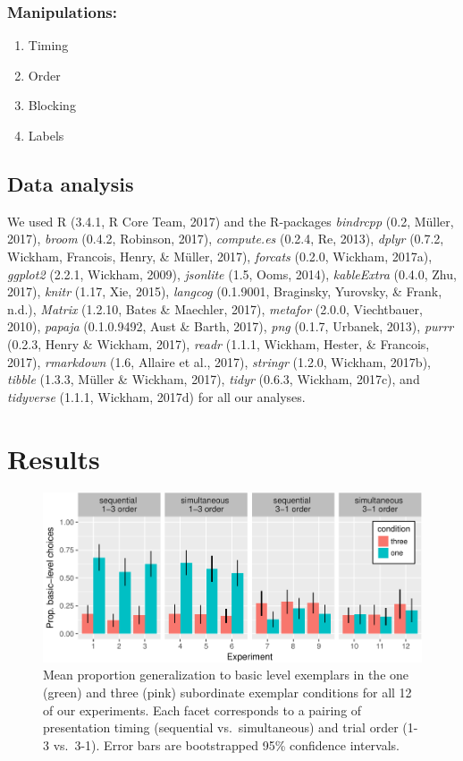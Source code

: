 \documentclass[english,floatsintext,man]{apa6}
\providecommand{\tightlist}{%
  \setlength{\itemsep}{0pt}\setlength{\parskip}{0pt}}
\theoremstyle{definition}
\theoremstyle{definition}
\theoremstyle{remark}
\begin{document}
\subsubsection{Manipulations:}\label{manipulations}

\begin{enumerate}
\def\labelenumi{(\arabic{enumi})}
\tightlist
\item
  Timing
\item
  Order
\item
  Blocking
\item
  Labels
\end{enumerate}

\subsection{Data analysis}\label{data-analysis}

We used R (3.4.1, R Core Team, 2017) and the R-packages \emph{bindrcpp}
(0.2, Müller, 2017), \emph{broom} (0.4.2, Robinson, 2017),
\emph{compute.es} (0.2.4, Re, 2013), \emph{dplyr} (0.7.2, Wickham,
Francois, Henry, \& Müller, 2017), \emph{forcats} (0.2.0, Wickham,
2017a), \emph{ggplot2} (2.2.1, Wickham, 2009), \emph{jsonlite} (1.5,
Ooms, 2014), \emph{kableExtra} (0.4.0, Zhu, 2017), \emph{knitr} (1.17,
Xie, 2015), \emph{langcog} (0.1.9001, Braginsky, Yurovsky, \& Frank,
n.d.), \emph{Matrix} (1.2.10, Bates \& Maechler, 2017), \emph{metafor}
(2.0.0, Viechtbauer, 2010), \emph{papaja} (0.1.0.9492, Aust \& Barth,
2017), \emph{png} (0.1.7, Urbanek, 2013), \emph{purrr} (0.2.3, Henry \&
Wickham, 2017), \emph{readr} (1.1.1, Wickham, Hester, \& Francois,
2017), \emph{rmarkdown} (1.6, Allaire et al., 2017), \emph{stringr}
(1.2.0, Wickham, 2017b), \emph{tibble} (1.3.3, Müller \& Wickham, 2017),
\emph{tidyr} (0.6.3, Wickham, 2017c), and \emph{tidyverse} (1.1.1,
Wickham, 2017d) for all our analyses.

\section{Results}\label{results}

\begin{figure}
\centering
\includegraphics{xtmem_files/figure-latex/unnamed-chunk-2-1.pdf}
\caption{\label{fig:unnamed-chunk-2}Mean proportion generalization to basic
level exemplars in the one (green) and three (pink) subordinate exemplar
conditions for all 12 of our experiments. Each facet corresponds to a
pairing of presentation timing (sequential vs.~simultaneous) and trial
order (1-3 vs.~3-1). Error bars are bootstrapped 95\% confidence
intervals.}
\end{figure}
\end{document}

